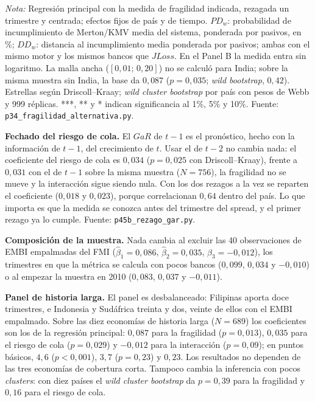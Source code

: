 \begin{table}[htbp]
\par\smallskip\parbox{0.95\linewidth}{\footnotesize \textit{Nota:} Regresión principal con la medida de fragilidad indicada, rezagada un trimestre y centrada; efectos fijos de país y de tiempo. $PD_w$: probabilidad de incumplimiento de Merton/KMV media del sistema, ponderada por pasivos, en \%; $DD_w$: distancia al incumplimiento media ponderada por pasivos; ambas con el mismo motor y los mismos bancos que $JLoss$. En el Panel B la medida entra sin logaritmo. La malla ancha ($[0{,}01;\,0{,}20]$) no se calculó para India; sobre la misma muestra sin India, la base da $0{,}087$ ($p=0{,}035$; \textit{wild bootstrap}, $0{,}42$). Estrellas según Driscoll--Kraay; \textit{wild cluster bootstrap} por país con pesos de Webb y 999 réplicas. ***, ** y * indican significancia al 1\%, 5\% y 10\%. Fuente: \texttt{p34\_fragilidad\_alternativa.py}.}
\end{table}

\textbf{Fechado del riesgo de cola.} El $GaR$ de $t-1$ es el pronóstico, hecho con la información de $t-1$, del crecimiento de $t$. Usar el de $t-2$ no cambia nada: el coeficiente del riesgo de cola es $0{,}034$ ($p=0{,}025$ con Driscoll--Kraay), frente a $0{,}031$ con el de $t-1$ sobre la misma muestra ($N=756$), la fragilidad no se mueve y la interacción sigue siendo nula. Con los dos rezagos a la vez se reparten el coeficiente ($0{,}018$ y $0{,}023$), porque correlacionan $0{,}64$ dentro del país. Lo que importa es que la medida se conozca antes del trimestre del spread, y el primer rezago ya lo cumple. Fuente: \texttt{p45b\_rezago\_gar.py}.

\textbf{Composición de la muestra.} Nada cambia al excluir las 40 observaciones de EMBI empalmadas del FMI ($\hat\beta_1=0{,}086$, $\hat\beta_2=0{,}035$, $\hat\beta_3=-0{,}012$), los trimestres en que la métrica se calcula con pocos bancos ($0{,}099$, $0{,}034$ y $-0{,}010$) o al empezar la muestra en 2010 ($0{,}083$, $0{,}037$ y $-0{,}011$).

\textbf{Panel de historia larga.} El panel es desbalanceado: Filipinas aporta doce trimestres, e Indonesia y Sudáfrica treinta y dos, veinte de ellos con el EMBI empalmado. Sobre las diez economías de historia larga ($N=689$) los coeficientes son los de la regresión principal: $0{,}087$ para la fragilidad ($p=0{,}013$), $0{,}035$ para el riesgo de cola ($p=0{,}029$) y $-0{,}012$ para la interacción ($p=0{,}09$); en puntos básicos, $4{,}6$ ($p<0{,}001$), $3{,}7$ ($p=0{,}23$) y $0{,}23$. Los resultados no dependen de las tres economías de cobertura corta. Tampoco cambia la inferencia con pocos \textit{clusters}: con diez países el \textit{wild cluster bootstrap} da $p=0{,}39$ para la fragilidad y $0{,}16$ para el riesgo de cola.

